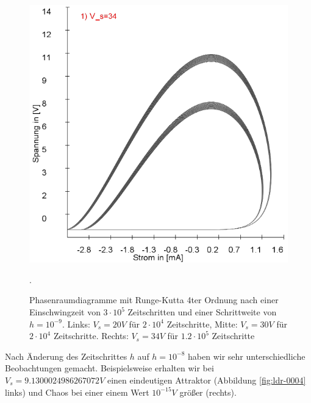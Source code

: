 \documentclass[12pt,a4paper]{article}
\begin{document}
\begin{figure}[!htbp]
\includegraphics[scale=0.26]{schwing-runge-nach300k-weitere120k-10-9-34V}
\caption{Phasenraumdiagramme mit Runge-Kutta 4ter Ordnung nach einer Einschwingzeit von  $3\cdot10^5$ Zeitschritten und einer Schrittweite von $h=10^{-9}$. Links: $V_s=20V$ für $2\cdot10^4$ Zeitschritte, Mitte: $V_s=30V$ für $2\cdot10^4$ Zeitschritte. Rechts: $V_s=34V$ für $1.2\cdot10^5$ Zeitschritte}. 
\label{fig:ldr-0003}
\end{figure}
\newline
Nach Änderung des Zeitschrittes $h$ auf $h=10^{-8}$ haben wir sehr unterschiedliche Beobachtungen gemacht. Beispielsweise erhalten wir bei $V_s=9.1300024986267072V$ einen eindeutigen Attraktor (Abbildung \ref{fig:ldr-0004} links) und Chaos bei einer einem Wert $10^{-15}V$ größer (rechts).
\end{document}
